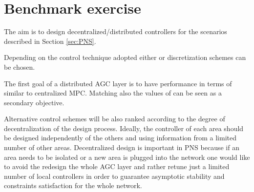 \documentclass[a4paper]{article}
\begin{document}
     
     \section{Benchmark exercise}
          The aim is to design decentralized/distributed controllers for the scenarios described in Section \ref{sec:PNS}.

          Depending on the control technique adopted either  or  discretization schemes can be chosen. 

          The first goal of a distributed AGC layer is to have performance in terms of  similar to centralized MPC. Matching also the values of  can be seen as a secondary objective.

          Alternative control schemes will be also ranked according to the degree of decentralization of the design process. Ideally, the controller of each area should be designed independently of the others and using information from a limited number of other areas. Decentralized design is important in PNS because if an area needs to be isolated or a new area is plugged into the network one would like to avoid the redesign the whole AGC layer and rather retune just a limited number of local controllers in order to guarantee asymptotic stability and constraints satisfaction for the whole network.


     
     
\end{document}
